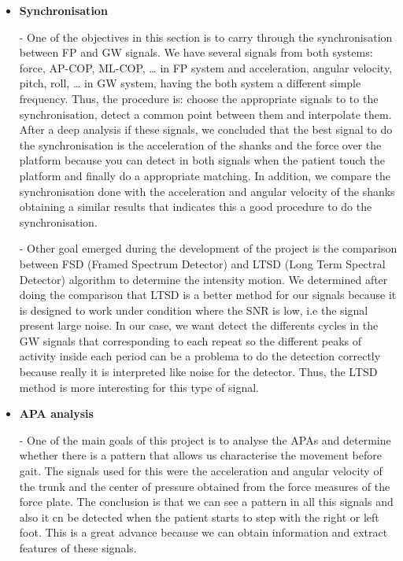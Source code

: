 \begin{itemize}
\item \textbf{Synchronisation}

-	One of the objectives in this section is to carry through the synchronisation between FP and GW signals. We have several signals from both systems: force, AP-COP, ML-COP, … in FP system and acceleration, angular velocity, pitch, roll, … in GW system, having the both system a different simple frequency. Thus, the procedure is: choose the appropriate signals to to the synchronisation, detect a common point between them and interpolate them.
After a deep analysis if these signals, we concluded that the best signal to do the synchronisation is the acceleration of the shanks and the force over the platform because you can detect in both signals when the patient touch the platform and finally do a appropriate matching.
In addition, we compare the synchronisation done with the acceleration and angular velocity of the shanks obtaining a similar results that indicates this a good procedure to do the synchronisation.

-	Other goal emerged during the development of the project is the comparison between FSD (Framed Spectrum Detector) and LTSD (Long Term Spectral Detector) algorithm to determine the intensity motion. We determined after doing the comparison that LTSD is a better method for our signals because it is designed to work under condition where the SNR is low, i.e the signal present large noise. In our case, we want detect the differents cycles in the GW signals that corresponding to each repeat so the different peaks of activity inside each period can be a problema to do the detection correctly because really it is interpreted like noise for the detector. Thus, the LTSD method is more interesting for this type of signal.


\item \textbf{APA analysis}

-	One of the main goals of this project is to analyse the APAs and determine whether there is a pattern that allows us characterise the movement before gait. The signals used for this were the acceleration and angular velocity of the trunk and the center of pressure obtained from the force measures of the force plate. The conclusion is that we can see a pattern in all this signals and also it cn be detected when the patient starts to step with the right or left foot. This is a great advance because we can obtain information and extract features of these signals.


\end{itemize}
